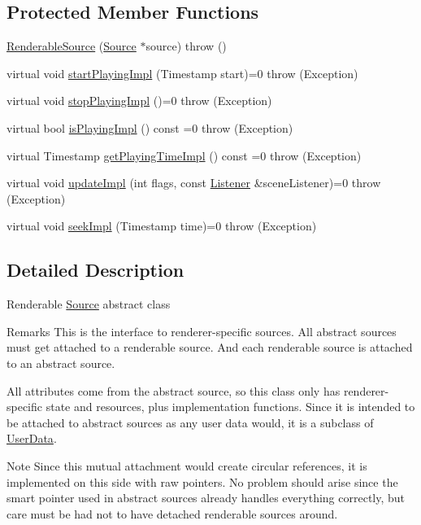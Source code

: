\subsection*{Protected Member Functions}
\begin{DoxyCompactItemize}
\item 
\hyperlink{classAudio_1_1RenderableSource_a9f6463d6ac12b05ec0d4c4a3717efd6c}{Renderable\+Source} (\hyperlink{classAudio_1_1Source}{Source} $\ast$source)  throw ()
\item 
virtual void \hyperlink{classAudio_1_1RenderableSource_a1d510d2a0326d059328471fe2b0536c2}{start\+Playing\+Impl} (Timestamp start)=0  throw (\+Exception)
\item 
virtual void \hyperlink{classAudio_1_1RenderableSource_ad0d0717ad12f0aded322f2317f1c42af}{stop\+Playing\+Impl} ()=0  throw (\+Exception)
\item 
virtual bool \hyperlink{classAudio_1_1RenderableSource_a0af32dc609d41e3c31c3d08a9285c816}{is\+Playing\+Impl} () const =0  throw (\+Exception)
\item 
virtual Timestamp \hyperlink{classAudio_1_1RenderableSource_acb999fb13ca1a83bac59525d4c655b42}{get\+Playing\+Time\+Impl} () const =0  throw (\+Exception)
\item 
virtual void \hyperlink{classAudio_1_1RenderableSource_ab13a51dbcd65af4fcdb69dd9da296ca7}{update\+Impl} (int flags, const \hyperlink{classAudio_1_1Listener}{Listener} \&scene\+Listener)=0  throw (\+Exception)
\item 
virtual void \hyperlink{classAudio_1_1RenderableSource_a6d56fd56f28410afa6a50cadc7014967}{seek\+Impl} (Timestamp time)=0  throw (\+Exception)
\end{DoxyCompactItemize}


\subsection{Detailed Description}
Renderable \hyperlink{classAudio_1_1Source}{Source} abstract class

\begin{DoxyRemark}{Remarks}
This is the interface to renderer-\/specific sources. All abstract sources must get attached to a renderable source. And each renderable source is attached to an abstract source. 
\end{DoxyRemark}
\begin{DoxyParagraph}{All attributes come from the abstract source, so this class only has renderer-\/specific}
state and resources, plus implementation functions. Since it is intended to be attached to abstract sources as any user data would, it is a subclass of \hyperlink{classAudio_1_1UserData}{User\+Data}. 
\end{DoxyParagraph}
\begin{DoxyNote}{Note}
Since this mutual attachment would create circular references, it is implemented on this side with raw pointers. No problem should arise since the smart pointer used in abstract sources already handles everything correctly, but care must be had not to have detached renderable sources around. 
\end{DoxyNote}


